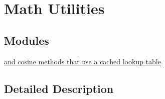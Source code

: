 \hypertarget{group___open_pilot}{\section{Math Utilities}
\label{group___open_pilot}
}
\subsection*{Modules}
\begin{DoxyCompactItemize}
\item 
\hyperlink{group___sine}{and cosine methods that use a cached lookup table}
\end{DoxyCompactItemize}


\subsection{Detailed Description}
